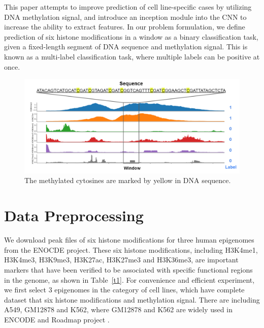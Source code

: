\hspace{24pt}

This paper attempts to improve prediction of cell line-specific cases by utilizing DNA methylation signal, and introduce an inception module into the CNN to increase the ability to extract features. In our problem formulation, we define prediction of six histone modifications in a window as a binary classification task, given a fixed-length segment of DNA sequence and methylation signal. This is known as a multi-label classification task, where multiple labels can be positive at once.

\begin{figure}[H]
    \centering
    \includegraphics[width=1\columnwidth]{body/figure/figure3.png}
    \captionsetup{labelfont=bf}
    \renewcommand{\baselinestretch}{1.0}
    \caption[Pair of input and label]{The methylated cytosines are marked by yellow in DNA sequence.}
    \label{f3}
\end{figure}

\section{Data Preprocessing}
We download peak files of six histone modifications for three human epigenomes from the ENOCDE project. These six histone modifications, including H3K4me1, H3K4me3, H3K9me3, H3K27ac, H3K27me3 and H3K36me3, are important markers that have been verified to be associated with specific functional regions in the genome, as shown in Table~\ref{t1}. For convenience and efficient experiment, we first select 3 epigenomes in the category of cell lines, which have complete dataset that six histone modifications and methylation signal. There are including A549, GM12878 and K562, where GM12878 and K562 are widely used in ENCODE and Roadmap project \cite{davis2018encyclopedia}\cite{kundaje2015integrative}.

